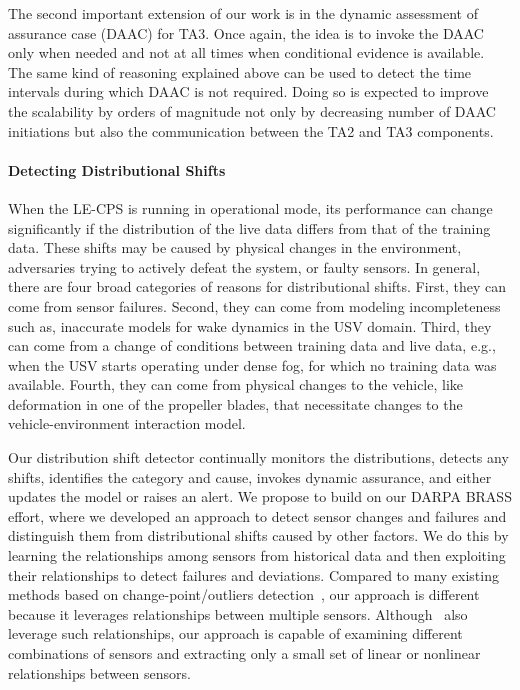 The second important extension of our work is in the dynamic assessment of assurance case (DAAC) for TA3. Once again, the idea is to invoke the DAAC only when needed and not at all times when conditional evidence is available. The same kind of reasoning explained above can be used to detect the time intervals during which DAAC is not required. Doing so is expected to improve the scalability by orders of magnitude not only by decreasing number of DAAC initiations but also the communication between the TA2 and TA3 components.


\paragraph{Detecting Distributional Shifts}

When the LE-CPS is running in operational mode, its performance can change significantly if the distribution of the live data differs from that of the training data. These shifts may be caused by physical changes in the environment, adversaries trying to actively defeat the system, or faulty sensors. In general, there are four broad categories of reasons for distributional shifts. First, they can come from sensor failures. Second, they can come from modeling incompleteness such as, inaccurate models for wake dynamics in the USV domain. Third, they can come from a change of conditions between training data and live data, e.g., when the USV starts operating under dense fog, for which no training data was available. Fourth, they can come from physical changes to the vehicle, like deformation in one of the propeller blades, that necessitate  changes to the vehicle-environment interaction model.

Our distribution shift detector continually monitors the distributions, detects any shifts, identifies the category and cause, invokes dynamic assurance,  and either updates the model or raises an alert. We propose to build on our DARPA BRASS effort, where we developed an approach to detect sensor changes and failures and distinguish them from distributional shifts caused by other factors. We do this by learning the relationships among sensors from historical data and then exploiting their relationships to detect failures and deviations. Compared to many existing methods based on change-point/outliers detection~\cite{basseville1993detection,gustafsson2000adaptive,brodsky2013nonparametric,aminikhanghahi2016survey}, our approach is different because it leverages relationships between multiple sensors. Although~\cite{dereszynski2012probabilistic,dietterich2012machine,dereszynski2011spatiotemporal} also leverage such relationships, our approach is capable of examining different combinations of sensors and extracting only a small set of linear or nonlinear relationships between sensors.

